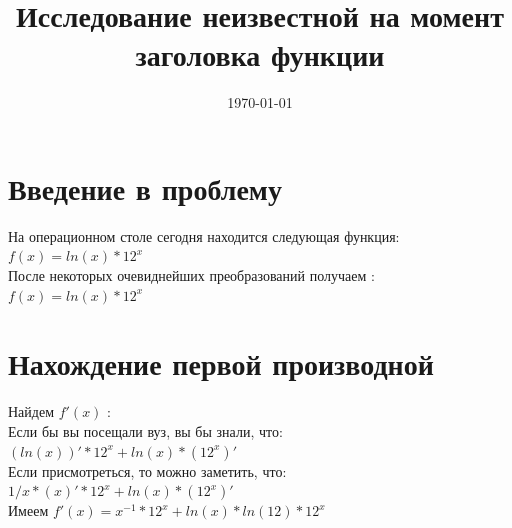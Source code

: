 \documentclass[a4paper]{article}
\title{Исследование неизвестной на момент заголовка функции}
\date{\today}
\begin{document}
\maketitle
\section{Введение в проблему}
На операционном столе сегодня находится следующая функция:\\
$f(x) = ln(x)*12^{x}$\\
После некоторых очевиднейших преобразований получаем :\\
$f(x) = ln(x)*12^{x}$\\
\section{Нахождение первой производной}
Найдем $f\prime(x)$ :\\Если бы вы посещали вуз, вы бы знали, что:\\
$(ln(x))\prime*12^{x}+ln(x)*(12^{x})\prime$\\
Если присмотреться, то можно заметить, что:\\
$1/x*(x)\prime*12^{x}+ln(x)*(12^{x})\prime$\\
Имеем $f\prime(x) = x^{-1}*12^{x}+ln(x)*ln(12)*12^{x}$\\
\end{document}
